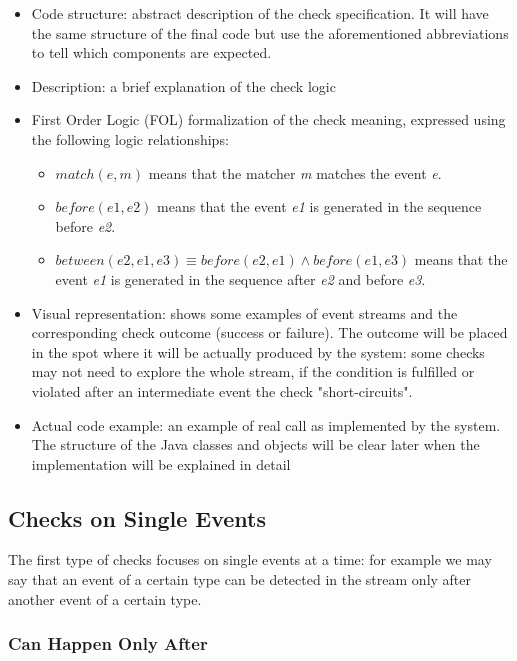 \documentclass[11pt,a4paper,notitlepage]{article}
\begin{document}
\begin{itemize}
	\item Code structure: abstract description of the check specification. It will have the same structure of the final code but use the aforementioned abbreviations to tell which components are expected.
	\item Description: a brief explanation of the check logic
	\item First Order Logic (FOL) formalization of the check meaning, expressed using the following logic relationships:
	\begin{itemize}
		\item $match(e, m)$ means that the matcher \textit{m} matches the event \textit{e}.
		\item $before(e1, e2)$ means that the event \textit{e1} is generated in the sequence before \textit{e2}.
		\item $between(e2, e1, e3) \equiv before(e2, e1) \land before(e1, e3)$ means that the event \textit{e1} is generated in the sequence after \textit{e2} and before 		\textit{e3}.
	\end{itemize}
	\item Visual representation: shows some examples of event streams and the corresponding check outcome (success or failure). The outcome will be placed in the spot where it will be actually produced by the system: some checks may not need to explore the whole stream, if the condition is fulfilled or violated after an intermediate event the check "short-circuits".
	\item Actual code example: an example of real call as implemented by the system. The structure of the Java classes and objects will be clear later when the implementation will be explained in detail
\end{itemize}


\subsection{Checks on Single Events}

The first type of checks focuses on single events at a time: for example we may say that an event of a certain type can be detected in the stream only after another event of a certain type.

\subsubsection{Can Happen Only After}
\end{document}

